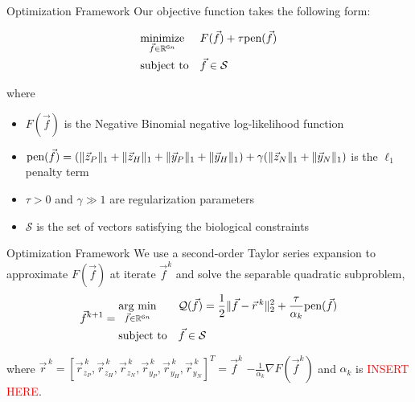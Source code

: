 \documentclass[10pt, t]{beamer}
\begin{document}
\begin{frame}{Optimization Framework}
Our objective function takes the following form:

\begin{equation*} \label{minimizationProblem}
    \begin{aligned}
        & \underset{\vec{f} \in \mathbb{R}^{6n}}{\text{minimize}}
        & & F(\vec{f}) + \tau \text{pen}(\vec{f}) \\
        & \text{subject to}
        & & \vec{f} \in \mathcal{S}
    \end{aligned}
\end{equation*}

where 
\begin{itemize}
    \item $F(\vec{f})$ is the Negative Binomial negative log-likelihood function
    \item $\text{pen}(\vec{f}) = (\|\vec{z}_P\|_1 + \|\vec{z}_H\|_1 + \|\vec{y}_P\|_1 + \|\vec{y}_H\|_1) + \gamma (\|\vec{z}_N\|_1 + \|\vec{y}_N\|_1)$ is the $\ell_1$ penalty term
    \item $\tau > 0 $ and $\gamma \gg 1$ are regularization parameters
    \item $\mathcal{S}$ is the set of vectors satisfying the biological constraints
\end{itemize}
\end{frame}

\begin{frame}{Optimization Framework}
 We use a second-order Taylor series expansion to approximate $F(\vec{f})$ at iterate $\vec{f}^k$ and solve the separable quadratic subproblem,
 \smallskip
 \begin{equation} \label{subproblemIterate}
 	\vec{f}^{k+1} = 
 	\begin{aligned}
 		& \underset{\vec{f} \in \mathbb{R}^{6n}}{\text{arg min}}
 		& & \mathcal{Q}(\vec{f})= \frac{1}{2}\|\vec{f} - \vec{r}^{\,k}\|_2^2 + \frac{\tau}{\alpha_k} \text{pen}(\vec{f}) \\
 		& \text{subject to}
 		& & \vec{f} \in \mathcal{S}
 	\end{aligned}
 \end{equation}

\smallskip
where $\vec{r}^{\,k} = 
[\vec{r}_{z_P}^{\,k} ,\vec{r}_{z_H}^{\,k},\vec{r}_{z_N}^{\,k},\vec{r}_{y_P}^{\,k},\vec{r}_{y_H}^{\,k},\vec{r}_{y_N}^{\,k}]^T
= \vec{f}^k $ $- \frac{1}{\alpha_k} \nabla F(\vec{f}^k)$ and $\alpha_k$ is \textcolor{red}{INSERT HERE}.

\end{frame}
\end{document}
